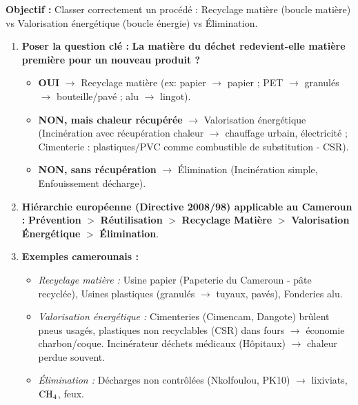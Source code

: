 \documentclass[11pt]{article}
\newcommand{\cle}[1]{{\popxbold\color{popdark}#1}}
\begin{document}
\begin{methode}
\textbf{Objectif :} Classer correctement un procédé : \cle{Recyclage matière} (boucle matière) vs \cle{Valorisation énergétique} (boucle énergie) vs \cle{Élimination}.
\begin{enumerate}
    \item \textbf{Poser la question clé :} \og \textbf{La matière du déchet redevient-elle matière première pour un nouveau produit ?} \fg{}
    \begin{itemize}
        \item \textbf{OUI} $\rightarrow$ \cle{Recyclage matière} (ex: papier $\rightarrow$ papier ; PET $\rightarrow$ granulés $\rightarrow$ bouteille/pavé ; alu $\rightarrow$ lingot).
        \item \textbf{NON, mais chaleur récupérée} $\rightarrow$ \cle{Valorisation énergétique} (Incinération avec récupération chaleur $\rightarrow$ chauffage urbain, électricité ; Cimenterie : plastiques/PVC comme combustible de substitution - CSR).
        \item \textbf{NON, sans récupération} $\rightarrow$ \cle{Élimination} (Incinération simple, Enfouissement décharge).
    \end{itemize}
    \item \textbf{Hiérarchie européenne (Directive 2008/98) applicable au Cameroun :}
    \textbf{Prévention} $>$ \textbf{Réutilisation} $>$ \textbf{Recyclage Matière} $>$ \textbf{Valorisation Énergétique} $>$ \textbf{Élimination}.
    \item \textbf{Exemples camerounais :}
    \begin{itemize}
        \item \textit{Recyclage matière :} Usine papier (Papeterie du Cameroun - pâte recyclée), Usines plastiques (granulés $\rightarrow$ tuyaux, pavés), Fonderies alu.
        \item \textit{Valorisation énergétique :} Cimenteries (Cimencam, Dangote) brûlent pneus usagés, plastiques non recyclables (CSR) dans fours $\rightarrow$ économie charbon/coque. Incinérateur déchets médicaux (Hôpitaux) $\rightarrow$ chaleur perdue souvent.
        \item \textit{Élimination :} Décharges non contrôlées (Nkolfoulou, PK10) $\rightarrow$ lixiviats, $\ce{CH4}$, feux.
    \end{itemize}
\end{enumerate}
\end{methode}
\end{document}

